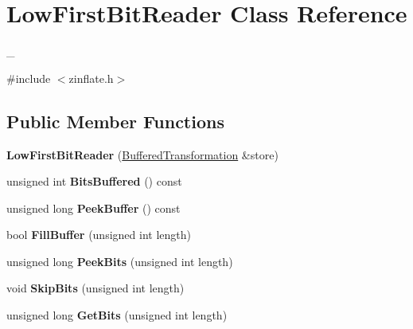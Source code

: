 \hypertarget{class_low_first_bit_reader}{
\section{LowFirstBitReader Class Reference}
\label{class_low_first_bit_reader}
}


\_\-  


{\ttfamily \#include $<$zinflate.h$>$}\subsection*{Public Member Functions}
\begin{DoxyCompactItemize}
\item 
\hypertarget{class_low_first_bit_reader_a41003d6dad1fa5c03c73cee2c3a47200}{
{\bfseries LowFirstBitReader} (\hyperlink{class_buffered_transformation}{BufferedTransformation} \&store)}
\label{class_low_first_bit_reader_a41003d6dad1fa5c03c73cee2c3a47200}

\item 
\hypertarget{class_low_first_bit_reader_a5b9e7c79fa4fbe2c55c52e1559f76297}{
unsigned int {\bfseries BitsBuffered} () const }
\label{class_low_first_bit_reader_a5b9e7c79fa4fbe2c55c52e1559f76297}

\item 
\hypertarget{class_low_first_bit_reader_a80885707c6d6d84dc5e4c6affbe90735}{
unsigned long {\bfseries PeekBuffer} () const }
\label{class_low_first_bit_reader_a80885707c6d6d84dc5e4c6affbe90735}

\item 
\hypertarget{class_low_first_bit_reader_a7c2250f093883488eefb6d498aa1c510}{
bool {\bfseries FillBuffer} (unsigned int length)}
\label{class_low_first_bit_reader_a7c2250f093883488eefb6d498aa1c510}

\item 
\hypertarget{class_low_first_bit_reader_a20e4e0eb1cd259c0447876ae565ec8e0}{
unsigned long {\bfseries PeekBits} (unsigned int length)}
\label{class_low_first_bit_reader_a20e4e0eb1cd259c0447876ae565ec8e0}

\item 
\hypertarget{class_low_first_bit_reader_a7127a720aeefbc1d91dddefc694538c6}{
void {\bfseries SkipBits} (unsigned int length)}
\label{class_low_first_bit_reader_a7127a720aeefbc1d91dddefc694538c6}

\item 
\hypertarget{class_low_first_bit_reader_aecfd76bf8814829b75d9d4f6592a4625}{
unsigned long {\bfseries GetBits} (unsigned int length)}
\label{class_low_first_bit_reader_aecfd76bf8814829b75d9d4f6592a4625}

\end{DoxyCompactItemize}



